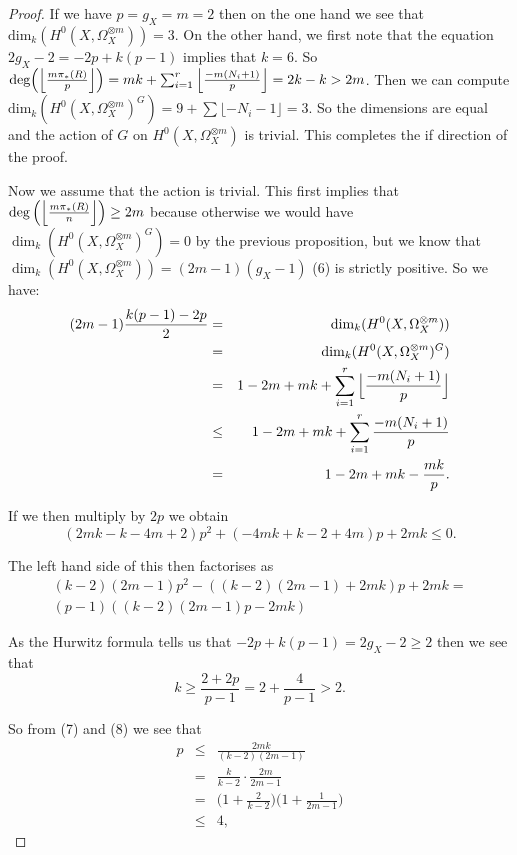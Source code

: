 \documentclass[11pt]{article} %
\begin{document}
\begin{proof}
	If we have $p=g_X=m=2$ then on the one hand we see that $\mbox{dim}_k(H^0(X,\Omega_X^{\otimes m}))=3$. 
	On the other hand, we first note that the equation $2g_X-2=-2p+k(p-1)$ implies that $k=6$. 
	So $\mbox{deg}\Big(\Big{\lfloor}{\frac{m\pi_*(R)}{p}}\Big{\rfloor}\Big)=mk+\sum_{i=1}^r\Big{\lfloor}{\frac{-m(N_i+1)}{p}}\Big{\rfloor}=2k-k>2m$. 		Then we can compute $\mbox{dim}_k(H^0(X,\Omega_X^{\otimes m})^G)=9+\sum\lfloor-N_i-1\rfloor=3$. So 	the dimensions are equal and the action of $G$ on $H^0(X,\Omega_X^{\otimes m})$ is trivial. This 		completes the if direction of the proof.

	Now we assume that the action is trivial. This first implies that 
	$\deg\Big(\Big{\lfloor}\frac{m\pi_*(R)}{n}\Big{\rfloor}\Big)\geq 2m$ because otherwise we would 
	have $\dim_k(H^0(X,\Omega_X^{\otimes m})^G)=0$ by the previous proposition, but we know that 
	$\dim_k(H^0(X,\Omega_X^{\otimes m}))=(2m-1)(g_X-1)$ (6) is strictly positive. So we have:
		\begin{eqnarray}
			(2m-1)\frac{k(p-1)-2p}{2} & = & \dim_k(H^0(X,\Omega_X^{\otimes m})) \nonumber\\
			& = & \dim_k(H^0(X,\Omega_X^{\otimes m})^G) \nonumber\\
			& = & 1-2m+mk+\sum_{i=1}^r\Big{\lfloor}\frac{-m(N_i+1)}{p}\Big{\rfloor}\nonumber \\
			& \leq & 1-2m+mk+\sum_{i=1}^r\frac{-m(N_i+1)}{p}\nonumber \\
			& = & 1-2m+mk-\frac{mk}{p}.
		\end{eqnarray}

	If we then multiply by $2p$ we obtain
		\begin{equation}
			(2mk-k-4m+2)p^2+(-4mk+k-2+4m)p+2mk\leq 0.
		\end{equation}

	The left hand side of this then factorises as
		\begin{multline*}
			(k-2)(2m-1)p^2-((k-2)(2m-1)+2mk)p+2mk = \\
			(p-1)((k-2)(2m-1)p-2mk)
		\end{multline*}

	As the Hurwitz formula tells us that $-2p+k(p-1)=2g_X-2 \geq 2$ then we see that 
		\begin{equation}
			k\geq \frac{2+2p}{p-1}=2+\frac{4}{p-1}>2.
		\end{equation}

	So from (7) and (8) we see that
		\begin{eqnarray}
			p & \leq & \frac{2mk}{(k-2)(2m-1)}\nonumber\\
			& = & \frac{k}{k-2}\cdot\frac{2m}{2m-1}\nonumber\\
			& = & \Big( 1+\frac{2}{k-2} \Big) \Big(1+\frac{1}{2m-1} \Big)\\
			& \leq & 4, \nonumber	
		\end{eqnarray}


\end{proof}
\end{document}
